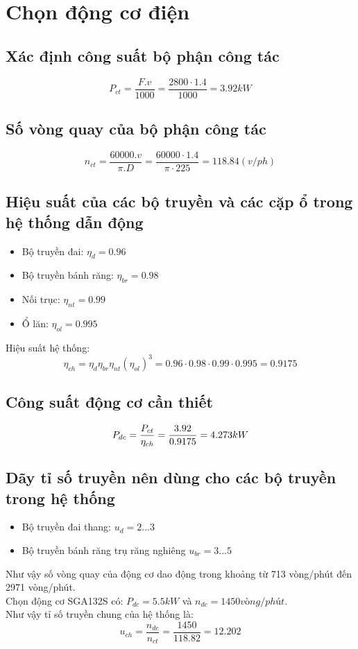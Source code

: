\chapter{Chọn động cơ điện}
\section{Xác định công suất bộ phận công tác}
\[
    P_{ct} = \frac{F.v}{1000} = \frac{2800 \cdot 1.4}{1000} = 3.92 kW
\]
\section{Số vòng quay của bộ phận công tác}
\begin{center}
\[
    n_{ct} = \frac{60000.v}{\pi.D} = \frac{60000\cdot1.4}{\pi\cdot225} = 118.84 (v/ph)
\]
\end{center}
\section{Hiệu suất của các bộ truyền và các cặp ổ trong hệ thống dẫn động}
\begin{itemize}
    \item Bộ truyền đai: $\eta_{d} = 0.96$ 
    \item Bộ truyền bánh răng: $\eta_{br} = 0.98$
    \item Nối trục: $\eta_{nt} = 0.99$
    \item Ổ lăn: $\eta_{ol} = 0.995$
\end{itemize}
Hiệu suất hệ thống:
\[
    \eta _{ch} = \eta_{d}\eta_{br}\eta_{nt}(\eta_{ol})^3 = 0.96 \cdot 0.98 \cdot 0.99 \cdot 0.995 = 0.9175
\]
\section{Công suất động cơ cần thiết}
\[
    P_{dc} = \frac{P_{ct}}{\eta_{ch}} = \frac{3.92}{0.9175} = 4.273 kW\\
\]    
\section{Dãy tỉ số truyền nên dùng cho các bộ truyền trong hệ thống}

\begin{itemize}
    \item Bộ truyền đai thang: $u_{d} = 2...3$
    \item Bộ truyền bánh răng trụ răng nghiêng $u_{br} = 3...5$
\end{itemize}
Như vậy số vòng quay của động cơ dao động trong khoảng từ 713 vòng/phút đến 2971 vòng/phút.\\
Chọn động cơ SGA132S có: $P_{dc} = 5.5 kW$ và $n_{dc} = 1450 vòng/phút$. \\
Như vậy tỉ số truyền chung của hệ thống là:
\[
    u_{ch} =\frac{n_{dc}}{n_{ct}} = \frac{1450}{118.82} = 12.202
\]

